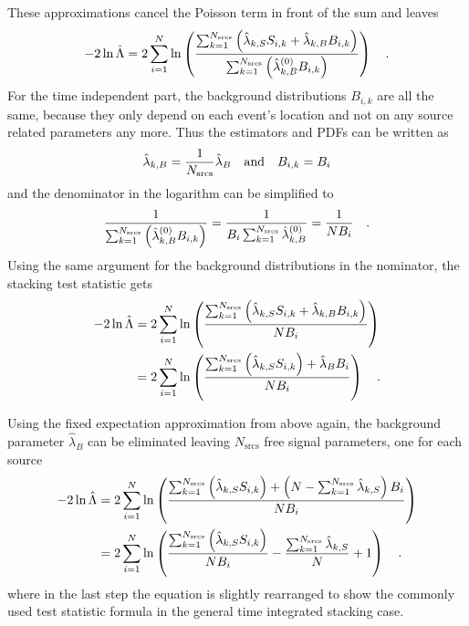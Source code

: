These approximations cancel the Poisson term in front of the sum and leaves
\begin{equation}
  -2\ln\hat{\Lambda}
  = 2\sum_{i=1}^N \ln\left(
    \frac{\sum_{k=1}^{N_\text{srcs}}\left(
          \hat{\lambda}_{k,S} S_{i,k}+\hat{\lambda}_{k,B} B_{i,k}\right)}
          {\sum_{k=1}^{N_\text{srcs}}\left(
            \hat{\lambda}_{k,B}^{(0)} B_{i,k} \right)}
        \right)
  \quad\text{.}
\end{equation}
For the time independent part, the background distributions $B_{i,k}$ are all the same, because they only depend on each event's location and not on any source related parameters any more.
Thus the estimators and PDFs can be written as
\begin{equation}
  \hat{\lambda}_{k,B} = \frac{1}{N_\text{srcs}} \hat{\lambda}_B
  \quad\text{and}\quad B_{i,k} = B_i
\end{equation}
and the denominator in the logarithm can be simplified to
\begin{equation}
  \frac{1}{\sum_{k=1}^{N_\text{srcs}}\left(
           \hat{\lambda}_{k,B}^{(0)}B_{i,k} \right)}
  = \frac{1}{B_i \sum_{k=1}^{N_\text{srcs}}\hat{\lambda}_{k,B}^{(0)}}
  = \frac{1}{N B_i}
  \quad\text{.}
\end{equation}
Using the same argument for the background distributions in the nominator, the stacking test statistic gets
\begin{align}
  -2\ln\hat{\Lambda}
  &= 2\sum_{i=1}^N \ln\left(
    \frac{\sum_{k=1}^{N_\text{srcs}}\left(
          \hat{\lambda}_{k,S} S_{i,k}+\hat{\lambda}_{k,B} B_{i,k}\right)}
          {N B_i} \right) \\
  &= 2\sum_{i=1}^N \ln\left(
    \frac{\sum_{k=1}^{N_\text{srcs}}\left(\hat{\lambda}_{k,S} S_{i,k}\right) +
          \hat{\lambda}_B B_i}{N B_i} \right)
  \quad\text{.}
\end{align}

Using the fixed expectation approximation from above again, the background parameter $\hat{\lambda}_B$ can be eliminated leaving $N_\text{srcs}$ free signal parameters, one for each source
\begin{align}
  -2\ln\hat{\Lambda}
  &= 2\sum_{i=1}^N \ln\left(
    \frac{\sum_{k=1}^{N_\text{srcs}}\left(\hat{\lambda}_{k,S} S_{i,k}\right) +
          \left(
            N - \sum_{k=1}^{N_\text{srcs}}\hat{\lambda}_{k,S}
          \right) B_i}{N B_i} \right) \\
  &= 2\sum_{i=1}^N \ln\left(
      \frac{\sum_{k=1}^{N_\text{srcs}}\left(\hat{\lambda}_{k,S}
              S_{i,k}\right)}{N B_i} -
      \frac{\sum_{k=1}^{N_\text{srcs}}\hat{\lambda}_{k,S}}{N} + 1
    \right)
  \quad\text{.}
\end{align}
where in the last step the equation is slightly rearranged to show the commonly used test statistic formula in the general time integrated stacking case.

